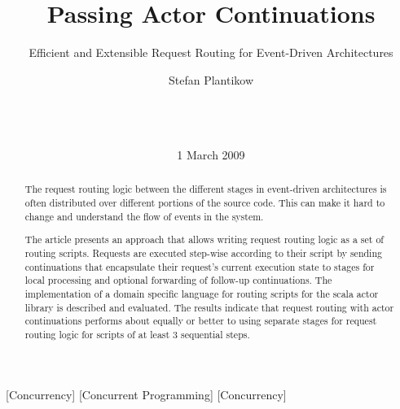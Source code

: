 \documentclass{sig-alternate}
\begin{document}

\title{Passing Actor Continuations}
\subtitle{Efficient and Extensible Request Routing for Event-Driven Architectures}


\author{
\alignauthor
Stefan Plantikow\\
       \\
       \\
       \\
}

\date{1 March 2009}


\maketitle

\begin{abstract}

The request routing logic between the different stages in event-driven architectures is often
distributed over different portions of the source code. This can make it hard to change and
understand the flow of events in the system.

The article presents an approach that allows writing request routing logic as a set of routing
scripts. Requests are executed step-wise according to their script by sending continuations that
encapsulate their request's current execution state to stages for local processing and optional
forwarding of follow-up continuations. The implementation of a domain specific language for routing
scripts for the scala actor library is described and evaluated. The results indicate that request
routing with actor continuations performs about equally or better to using separate stages for
request routing logic for scripts of at least 3 sequential steps.

\end{abstract}

[Concurrency]         
[Concurrent Programming]         
[Concurrency]

\end{document}

